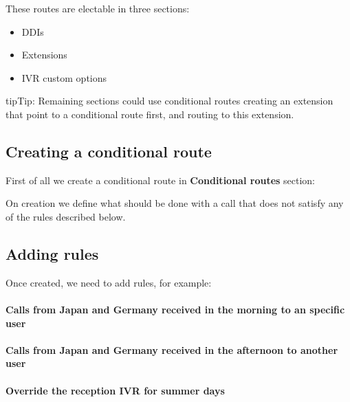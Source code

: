 \documentclass[letterpaper,10pt,english]{sphinxmanual}
\begin{document}
These routes are electable in three sections:
\begin{itemize}
\item {} 
DDIs

\item {} 
Extensions

\item {} 
IVR custom options

\end{itemize}

\begin{notice}{tip}{Tip:}
Remaining sections could use conditional routes creating an extension
that point to a conditional route first, and routing to this extension.
\end{notice}


\subsection{Creating a conditional route}
\label{pbx_features/conditional_routes:creating-a-conditional-route}
First of all we create a conditional route in \textbf{Conditional routes} section:

\noindent{}

On creation we define what should be done with a call that does not satisfy any
of the rules described below.


\subsection{Adding rules}
\label{pbx_features/conditional_routes:adding-rules}
Once created, we need to add rules, for example:
\paragraph{Calls from Japan and Germany received in the morning to an specific user}

\noindent{}
\paragraph{Calls from Japan and Germany received in the afternoon to another user}

\noindent{}
\paragraph{Override the reception IVR for summer days}
\end{document}
